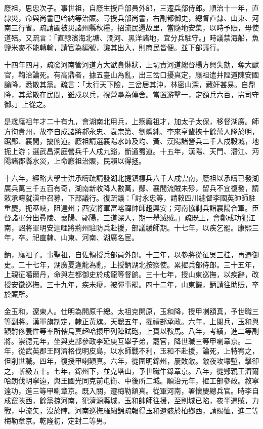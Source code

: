 \begin{pinyinscope}
廕祖，思忠次子。事世祖，自廕生授戶部員外郎，三遷兵部侍郎。順治十一年，直隸災，命與尚書巴哈納等治賑。尋授兵部尚書，右副都御史，總督直隸、山東、河南三行省。疏請蠲被災諸州縣秋糧，招流民還故里，當隨地安集，以時予賑，毋使道殕。又疏言：「直隸濱海北塘、澗河、黑洋諸地，宜分兵駐守。」時議禁海船，魚鹽米麥不能轉輸，請官為編號，譏其出入，則商民皆便。並下部議行。

十四年四月，疏發河南管河道方大猷貪惏狀，上切責河道總督楊方興失劾，奪大猷官，鞫治論死。有高鼎者，據五臺山為亂，出三岔口擾真定，廕祖遣井陘道陳安國諭降，悉散其黨。疏言：「太行天下險，三岔居其沖，林密山深，藏奸甚易。自鼎降，其黨散在民間，雖戍以兵，視營壘為傳舍。當置游擊一，定額兵六百，耑司守御。」上從之。

是歲廕祖年才二十有九，會湖南北用兵，上察廕祖才，加太子太保，移督湖廣。師方徇貴州，故李自成諸將郝永忠、袁宗第、劉體純、李來亨輩挾十餘萬人降於明，踞鄖、襄間，擾餉道。廕祖請選襄陽水師及均、黃、漢陽諸營兵二千人戍穀城，地扼上游；選武昌洞庭營兵千人戍九谿，斷通蜀道。十五年，漢陽、天門、潛江、沔陽諸郡縣水災，上命廕祖治賑，民賴以得拯。

十六年，經略大學士洪承疇疏請發湖北提鎮標兵六千人戍雲南，廕祖以承疇已發湖廣兵萬三千五百有奇，湖南新收降人數萬，鄖、襄間流賊未殄，留兵不宜復發，請敕承疇就滇中召募，下部議行。復疏議：「討永忠等，請敕四川總督李國英帥師駐重慶，扼巫峽，阻達州；西安將軍富喀禪帥師趨興安；河南協剿兵詣襄陽合軍。臣督諸軍分出彞陵、襄陽、鄖陽，三道深入，期一舉滅賊。」疏既上，會鄭成功犯江南，詔將軍明安達哩將荊州駐防兵赴援，部議緩師期。十七年，以疾乞罷。康熙三年，卒。祀直隸、山東、河南、湖廣名宦。

鈵，廕祖子。事聖祖，自佐領授兵部員外郎。十三年，以參將從征吳三桂，再遷御史。二十七年，湖廣夏逢龍為亂，上授鈵湖北按察使。累擢兵部侍郎。三十五年，上親征噶爾丹，命與左都御史於成龍等督餉。三十七年，授山東巡撫，以疾辭，改授安徽巡撫。三十九年，疾未瘳，被彈事罷。四十二年，山東饑，鈵請往助賑，卒於賑所。

金玉和，遼東人。仕明為開原千總。太祖克開原，玉和降，授甲喇額真，予世職三等副將。漢軍旗制定，隸正黃旗。天聰五年，擢禮部承政。六年，上閱兵，玉和與額駙佟養性等率所轄烏真超哈擐甲列陣試砲，上賚以鞍馬。八年，考績，進二等副將。崇德元年，坐與吏部參政李延庚互舉子弟，罷官，降世職三等甲喇章京。二年，從武英郡王阿濟格伐明皮島，以水師戰不利，玉和不赴援，論死，上特宥之，但削世職。四年，復授甲喇額真。六年，從圍明錦州，屢敗敵。敵夜攻壕塹，擊卻之，斬級五十。七年，錦州下，並克塔山，予世職牛錄章京。八年，從鄭親王濟爾哈朗伐明寧遠，與王國光同克前屯衛、中後所二城。順治元年，擢工部參政。敘寧遠功，進三等甲喇章京。既入關，遷梅勒額真。從軍河南，署懷慶總兵官。時李自成竄陜西，餘黨掠河南，犯濟源縣城，玉和帥師往援，至則城已陷，夜半遇賊，力戰，中流矢，沒於陣。河南巡撫羅繡錦疏報得玉和遺骸於柏鄉西，請賜恤，進二等梅勒章京。乾隆初，定封二等男。


\end{pinyinscope}

